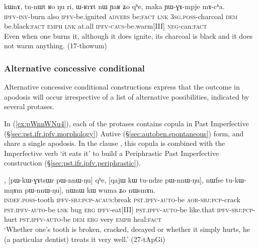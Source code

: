 \begin{exe}
\ex \label{ex:chWwGnWBlW.kWnA}
  kɯnɤ, tu-nɯt ʁo ŋu ri, ɯ-ʁrɤt nɯ ɲaʁ ʑo qʰe, maka ɲɯ-ɣɤ-mpje mɤ-cʰa. \\
  \textsc{ipfv}-\textsc{inv}-burn also \textsc{ipfv}-be.ignited \textsc{advers} be:\textsc{fact} \textsc{lnk}
\textsc{3sg}.\textsc{poss}-charcoal \textsc{dem}  be.black:\textsc{fact} \textsc{emph} \textsc{lnk} at.all \textsc{ipfv}-\textsc{caus}-be.warm[III] \textsc{neg}-can:\textsc{fact} \\
 \glt Even when one burns it, although it does ignite, its charcoal is black and it does not warm anything. (17-thowum)
\end{exe}
 
 \subsubsection{Alternative concessive conditional} \label{sec:alt.concessive.conditional}
Alternative concessive conditional constructions express that the outcome in apodosis will occur irrespective of a list of alternative possibilities, indicated by several protases. 


 In (\ref{ex:pWnnWNu4}), each of the protases contains copula  in Past Imperfective (§\ref{sec:pst.ifr.ipfv.morphology}) Autive (§\ref{sec:autoben.spontaneous}) form, and share a single apodosis. In the clause , this copula is combined with the Imperfective verb  `it eats it' to build a Periphrastic Past Imperfective construction (§\ref{sec:pst.ifr.ipfv.periphrastic}).

\begin{exe}
\ex  \label{ex:pWnnWNu4}
, [pɯ-kɯ-ɣɤtsɯr pɯ-nnɯ-ŋu] qʰe, [qajɯ kɯ tu-ndze pɯ-nnɯ-ŋu], nɯfse tu-kɯ-mŋɤm pɯ-nnɯ-ŋu], nɯnɯ kɯ wuma ʑo nɯsmɤn. \\
\textsc{indef}.\textsc{poss}-tooth \textsc{ipfv}-\textsc{sbj}:\textsc{pcp}-\textsc{acaus}:break \textsc{pst}.\textsc{ipfv}-\textsc{auto}-be
\textsc{aor}-\textsc{sbj}:\textsc{pcp}-crack \textsc{pst}.\textsc{ipfv}-\textsc{auto}-be \textsc{lnk}
bug \textsc{erg} \textsc{ipfv}-eat[III] \textsc{pst}.\textsc{ipfv}-\textsc{auto}-be 
like.that \textsc{ipfv}-\textsc{sbj}:\textsc{pcp}-hurt \textsc{pst}.\textsc{ipfv}-\textsc{auto}-be
\textsc{dem} \textsc{erg} very \textsc{emph} heal:\textsc{fact} \\
\glt `Whether one's tooth is broken, cracked, decayed or whether it simply hurts, he (a particular dentist) treats it very well.' (27-tApGi)
\end{exe}

